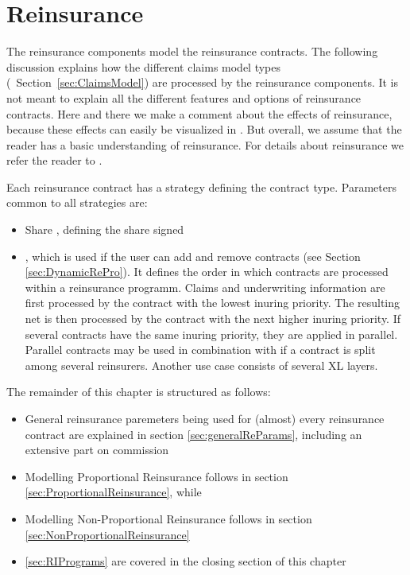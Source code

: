 \chapter{Reinsurance}
\label{chap:Reinsurance}


The reinsurance components model the reinsurance contracts. The following discussion explains how the different claims model types (\cf~Section~\ref{sec:ClaimsModel}) are processed by the reinsurance components. It is not meant to explain all the different features and options of reinsurance contracts. Here and there we make a comment about the effects of reinsurance, because these effects can easily be visualized in \RA{}. But overall, we assume that the reader has a basic understanding of reinsurance. For details about reinsurance we refer the reader to \cite{Gerathewohl1980, Liebwein2009}.

Each reinsurance contract has a strategy defining the contract type. Parameters common to all strategies are:

\begin{itemize}
	\item Share , defining the share signed
	\item {}, which is used if the user can add and remove contracts (see Section \ref{sec:DynamicRePro}). It defines the order in which contracts are processed within a reinsurance programm. Claims and underwriting information are first processed by the contract with the lowest inuring priority. The resulting net is then processed by the contract with the next higher inuring priority. If several contracts have the same inuring priority, they are applied in parallel. Parallel contracts may be used in combination with  if a contract is split among several reinsurers. Another use case consists of several XL layers.
\end{itemize}

The remainder of this chapter is structured as follows:

\begin{itemize}
	\item General reinsurance paremeters being used for (almost) every reinsurance contract are explained in section \ref{sec:generalReParams}, including an extensive part on commission
	\item Modelling Proportional Reinsurance follows in section \ref{sec:ProportionalReinsurance}, while
	\item Modelling Non-Proportional Reinsurance follows in section \ref{sec:NonProportionalReinsurance}
	\item \ref{sec:RIPrograms} are covered in the closing section of this chapter
\end{itemize}

